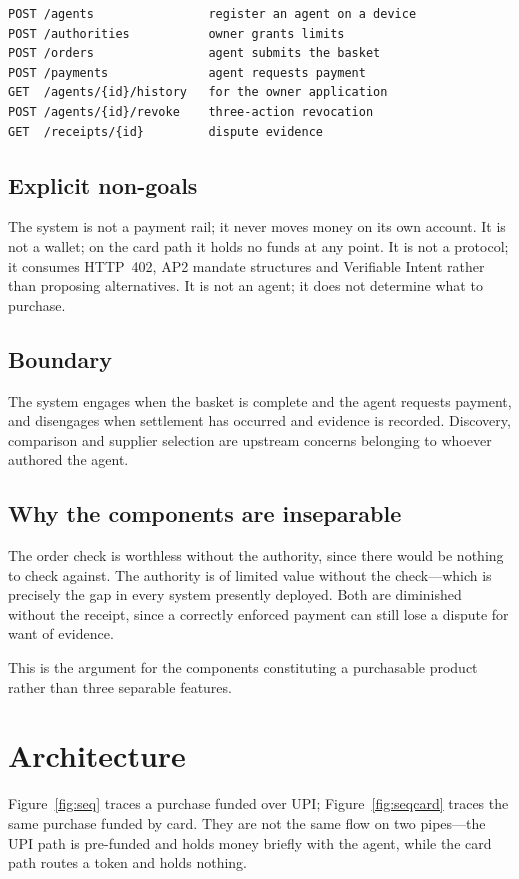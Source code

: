 \documentclass[journal,onecolumn,11pt]{IEEEtran}
\begin{document}
\begin{verbatim}
POST /agents                register an agent on a device
POST /authorities           owner grants limits
POST /orders                agent submits the basket
POST /payments              agent requests payment
GET  /agents/{id}/history   for the owner application
POST /agents/{id}/revoke    three-action revocation
GET  /receipts/{id}         dispute evidence
\end{verbatim}

\subsection{Explicit non-goals}
The system is not a payment rail; it never moves money on its own account. It is not a
wallet; on the card path it holds no funds at any point. It is not a protocol; it
consumes HTTP~402, AP2 mandate structures and Verifiable Intent rather than proposing
alternatives. It is not an agent; it does not determine what to purchase.

\subsection{Boundary}
The system engages when the basket is complete and the agent requests payment, and
disengages when settlement has occurred and evidence is recorded. Discovery, comparison
and supplier selection are upstream concerns belonging to whoever authored the agent.

\subsection{Why the components are inseparable}
The order check is worthless without the authority, since there would be nothing to
check against. The authority is of limited value without the check---which is precisely
the gap in every system presently deployed. Both are diminished without the receipt,
since a correctly enforced payment can still lose a dispute for want of evidence.

This is the argument for the components constituting a purchasable product rather than
three separable features.

\section{Architecture}\label{sec:arch}
Figure~\ref{fig:seq} traces a purchase funded over UPI; Figure~\ref{fig:seqcard}
traces the same purchase funded by card. They are not the same flow on two pipes---the
UPI path is pre-funded and holds money briefly with the agent, while the card path
routes a token and holds nothing.
\end{document}
